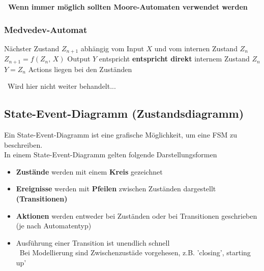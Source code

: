 \vspace{0.1cm}

\textbf{ \textrightarrow\ Wenn immer möglich sollten Moore-Automaten verwendet werden}

\subsubsection{Medvedev-Automat}

\begin{outline}
    \1 Nächster Zustand $Z_{n+1}$ abhängig vom Input $X$ und vom internen Zustand $Z_n$
        \2 $Z_{n+1} = f(Z_n, \, X)$
    \1 Output $Y$ entspricht \textbf{entspricht direkt} internem Zustand $Z_n$ 
        \2 $Y = Z_n$
    \1 Actions liegen bei den Zuständen
\end{outline}

\vspace{0.1cm}

\textrightarrow\ Wird hier nicht weiter behandelt...


\subsection{State-Event-Diagramm (Zustandsdiagramm)}

Ein State-Event-Diagramm ist eine grafische Möglichkeit, um eine FSM zu beschreiben. \\
In einem State-Event-Diagramm gelten folgende Darstellungsformen    %

\vspace{0.1cm}

\begin{itemize}
    \item \textbf{Zustände} werden mit einem \textbf{Kreis} gezeichnet
    \item \textbf{Ereignisse} werden mit \textbf{Pfeilen} zwischen Zuständen dargestellt \textbf{(Transitionen)}
    \item \textbf{Aktionen} werden entweder bei Zuständen oder bei Transitionen geschrieben (je nach Automatentyp)
    \item Ausführung einer Transition ist unendlich schnell \\
        \textrightarrow\ Bei Modellierung sind Zwischenzustäde vorgehesen, z.B. 'closing', starting up'
\end{itemize}



